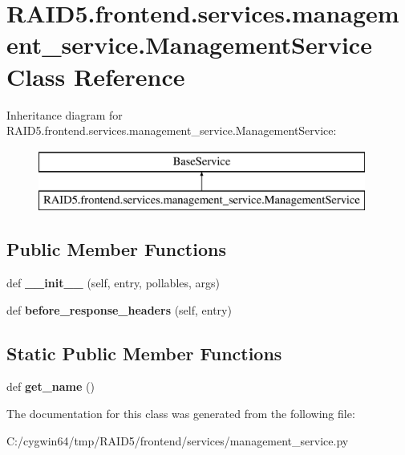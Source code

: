 \hypertarget{class_r_a_i_d5_1_1frontend_1_1services_1_1management__service_1_1_management_service}{}\section{R\+A\+I\+D5.\+frontend.\+services.\+management\+\_\+service.\+Management\+Service Class Reference}
\label{class_r_a_i_d5_1_1frontend_1_1services_1_1management__service_1_1_management_service}
Inheritance diagram for R\+A\+I\+D5.\+frontend.\+services.\+management\+\_\+service.\+Management\+Service\+:\begin{figure}[H]
\begin{center}
\leavevmode
\includegraphics[height=2.000000cm]{class_r_a_i_d5_1_1frontend_1_1services_1_1management__service_1_1_management_service}
\end{center}
\end{figure}
\subsection*{Public Member Functions}
\begin{DoxyCompactItemize}
\item 
\mbox{\label{class_r_a_i_d5_1_1frontend_1_1services_1_1management__service_1_1_management_service_a9f06b873fd105ad219ac8b67fa26a142}} 
def {\bfseries \+\_\+\+\_\+init\+\_\+\+\_\+} (self, entry, pollables, args)
\item 
\mbox{\label{class_r_a_i_d5_1_1frontend_1_1services_1_1management__service_1_1_management_service_a434179507908785a212e155c7ce28301}} 
def {\bfseries before\+\_\+response\+\_\+headers} (self, entry)
\end{DoxyCompactItemize}
\subsection*{Static Public Member Functions}
\begin{DoxyCompactItemize}
\item 
\mbox{\label{class_r_a_i_d5_1_1frontend_1_1services_1_1management__service_1_1_management_service_a31b7c8602e2dd72f68c0d2a596c936fd}} 
def {\bfseries get\+\_\+name} ()
\end{DoxyCompactItemize}


The documentation for this class was generated from the following file\+:\begin{DoxyCompactItemize}
\item 
C\+:/cygwin64/tmp/\+R\+A\+I\+D5/frontend/services/management\+\_\+service.\+py\end{DoxyCompactItemize}
